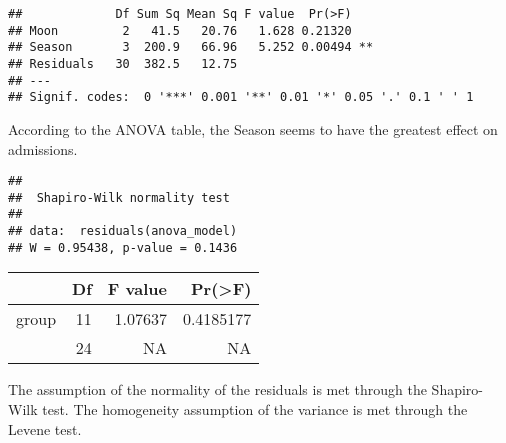 \documentclass[
]{article}
\begin{document}
\begin{verbatim}
##             Df Sum Sq Mean Sq F value  Pr(>F)   
## Moon         2   41.5   20.76   1.628 0.21320   
## Season       3  200.9   66.96   5.252 0.00494 **
## Residuals   30  382.5   12.75                   
## ---
## Signif. codes:  0 '***' 0.001 '**' 0.01 '*' 0.05 '.' 0.1 ' ' 1
\end{verbatim}

According to the ANOVA table, the Season seems to have the greatest
effect on admissions.

\begin{verbatim}
## 
##  Shapiro-Wilk normality test
## 
## data:  residuals(anova_model)
## W = 0.95438, p-value = 0.1436
\end{verbatim}

\begin{longtable}[]{@{}lrrr@{}}
\toprule\noalign{}
& Df & F value & Pr(\textgreater F) \\
\midrule\noalign{}
\endhead
\bottomrule\noalign{}
\endlastfoot
group & 11 & 1.07637 & 0.4185177 \\
& 24 & NA & NA \\
\end{longtable}

The assumption of the normality of the residuals is met through the
Shapiro-Wilk test. The homogeneity assumption of the variance is met
through the Levene test.
\end{document}
